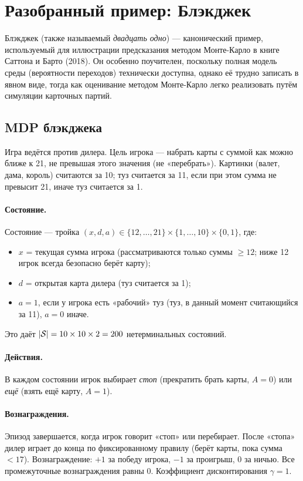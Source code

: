 \section{Разобранный пример: Блэкджек}
\label{sec:mc-blackjack}

Блэкджек (также называемый \emph{двадцать одно}) --- канонический пример, используемый для иллюстрации предсказания методом Монте-Карло в книге Саттона и Барто (2018).  Он особенно поучителен, поскольку полная модель среды (вероятности переходов) технически доступна, однако её трудно записать в явном виде, тогда как оценивание методом Монте-Карло легко реализовать путём симуляции карточных партий.

\subsection*{MDP блэкджека}

Игра ведётся против дилера.  Цель игрока --- набрать карты с суммой как можно ближе к 21, не превышая этого значения (не «перебрать»).  Картинки (валет, дама, король) считаются за 10; туз считается за 11, если при этом сумма не превысит 21, иначе туз считается за 1.

\paragraph{Состояние.}  Состояние --- тройка $(x, d, a) \in \{12,\dots,21\} \times \{1,\dots,10\} \times \{0,1\}$, где:
\begin{itemize}[leftmargin=*]
  \item $x$ = текущая сумма игрока (рассматриваются только суммы $\ge 12$; ниже 12 игрок всегда безопасно берёт карту);
  \item $d$ = открытая карта дилера (туз считается за 1);
  \item $a = 1$, если у игрока есть «рабочий» туз (туз, в данный момент считающийся за 11), $a = 0$ иначе.
\end{itemize}
Это даёт $|\mathcal{S}| = 10 \times 10 \times 2 = 200$ нетерминальных состояний.

\paragraph{Действия.}  В каждом состоянии игрок выбирает \emph{стоп} (прекратить брать карты, $A=0$) или \emph{ещё} (взять ещё карту, $A=1$).

\paragraph{Вознаграждения.}  Эпизод завершается, когда игрок говорит «стоп» или перебирает.  После «стопа» дилер играет до конца по фиксированному правилу (берёт карты, пока сумма $< 17$).  Вознаграждение: $+1$ за победу игрока, $-1$ за проигрыш, $0$ за ничью.  Все промежуточные вознаграждения равны $0$.  Коэффициент дисконтирования $\gamma = 1$.

